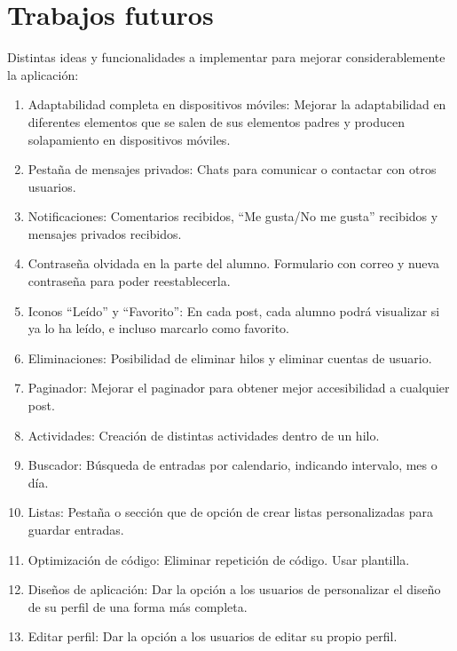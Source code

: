 \documentclass[a4paper, 12pt]{book}
\begin{document}
\section{Trabajos futuros}
\label{sec:trabajos_futuros}
Distintas ideas y funcionalidades a implementar para mejorar considerablemente la aplicaci\'on:
\begin{enumerate}
  \item Adaptabilidad completa en dispositivos m\'oviles: Mejorar la adaptabilidad en diferentes elementos que se salen de sus elementos padres y producen solapamiento en
  dispositivos m\'oviles.
  \item	Pesta\~na de mensajes privados: Chats para comunicar o contactar con otros usuarios.
  \item Notificaciones: Comentarios recibidos, ``Me gusta/No me gusta'' recibidos y mensajes privados recibidos.
  \item Contrase\~na olvidada en la parte del alumno. Formulario con correo y nueva contrase\~na para poder reestablecerla.
  \item Iconos ``Le\'ido'' y ``Favorito'': En cada post, cada alumno podr\'a visualizar si ya lo ha le\'ido, e incluso marcarlo como favorito.
  \item Eliminaciones: Posibilidad de eliminar hilos y eliminar cuentas de usuario.
  \item Paginador: Mejorar el paginador para obtener mejor accesibilidad a cualquier post.
  \item Actividades: Creaci\'on de distintas actividades dentro de un hilo.
  \item Buscador: B\'usqueda de entradas por calendario, indicando intervalo, mes o d\'ia.
  \item Listas: Pesta\~na o secci\'on que de opci\'on de crear listas personalizadas para guardar entradas.
  \item Optimizaci\'on de c\'odigo: Eliminar repetici\'on de c\'odigo. Usar plantilla.
  \item Dise\~nos de aplicaci\'on: Dar la opci\'on a los usuarios de personalizar el dise\~no de su perfil de una forma m\'as completa.
  \item Editar perfil: Dar la opci\'on a los usuarios de editar su propio perfil.
\end{enumerate}




\cleardoublepage
\appendix
\end{document}
